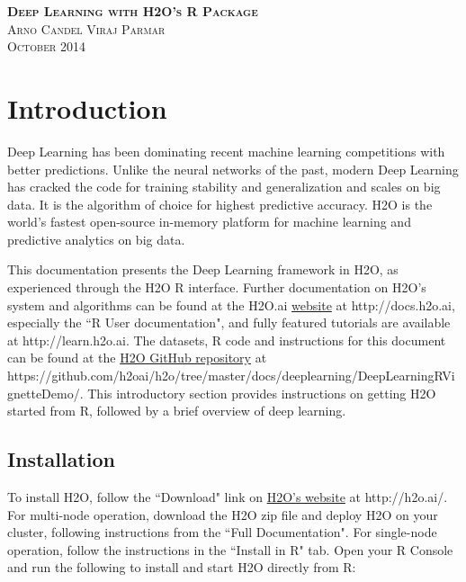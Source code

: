 \documentclass[11pt]{article}
\begin{document}
\thispagestyle{empty} %

\begin{center}
\textsc{\Large\bf{Deep Learning with H2O's R Package}}
\\
\bigskip
\textsc{\small{Arno Candel \hspace{40pt} Viraj Parmar}}
\\
\bigskip
\textsc{October 2014}
\end{center}

\tableofcontents

\newpage


\section{Introduction} \label{1}
Deep Learning has been dominating recent machine learning competitions with
better predictions. Unlike the neural networks of the past, modern Deep
Learning has cracked the code for training stability and generalization and
scales on big data. It is the algorithm of choice for highest predictive
accuracy. H2O is the world’s fastest open-source in-memory platform for machine
learning and predictive analytics on big data.

This documentation presents the Deep Learning framework in H2O, as experienced through the H2O R interface. Further documentation on H2O's system and algorithms can be found at the H2O.ai \href{http://docs.h2o.ai}{website} at http://docs.h2o.ai, especially the ``R User documentation", and fully featured tutorials are available at http://learn.h2o.ai. The datasets, R code and instructions for this document can be found at the \href{https://github.com/h2oai/h2o/tree/master/docs/deeplearning/DeepLearningRVignetteDemo}{H2O GitHub repository} at \\https://github.com/h2oai/h2o/tree/master/docs/deeplearning/DeepLearningRVignetteDemo/. This introductory section provides instructions on getting H2O started from R, followed by a brief overview of deep learning.

\subsection{Installation} \label{1.1}

To install H2O, follow the ``Download" link on \href{http://h2o.ai/}{H2O's website} at http://h2o.ai/. For multi-node operation, download the H2O zip file and deploy H2O on your cluster, following instructions from the ``Full Documentation". For single-node operation, follow the instructions in the ``Install in R" tab. Open your R Console and run the following to install and start H2O directly from R:
\end{document}

